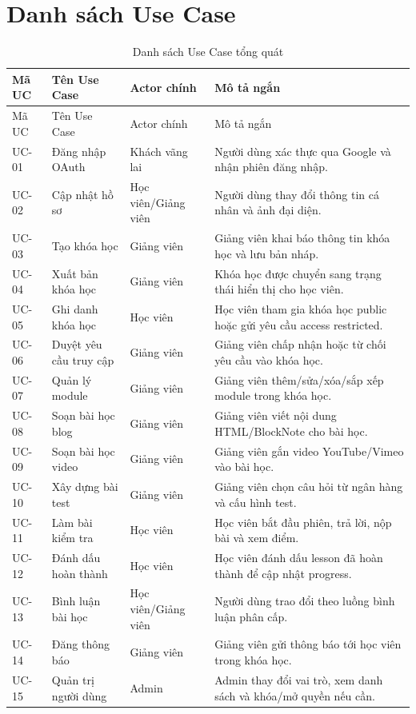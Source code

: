 \documentclass[12pt,a4paper]{report}
\begin{document}
\section{Danh sách Use Case}
\begin{longtable}{L{1.6cm} L{4.2cm} L{3cm} L{5.2cm}}
\caption{Danh sách Use Case tổng quát}\label{tab:usecases}\\
\toprule
Mã UC & Tên Use Case & Actor chính & Mô tả ngắn \\
\midrule
\endfirsthead
\toprule
Mã UC & Tên Use Case & Actor chính & Mô tả ngắn \\
\midrule
\endhead
UC-01 & Đăng nhập OAuth & Khách vãng lai & Người dùng xác thực qua Google và nhận phiên đăng nhập. \\
UC-02 & Cập nhật hồ sơ & Học viên/Giảng viên & Người dùng thay đổi thông tin cá nhân và ảnh đại diện. \\
UC-03 & Tạo khóa học & Giảng viên & Giảng viên khai báo thông tin khóa học và lưu bản nháp. \\
UC-04 & Xuất bản khóa học & Giảng viên & Khóa học được chuyển sang trạng thái hiển thị cho học viên. \\
UC-05 & Ghi danh khóa học & Học viên & Học viên tham gia khóa học public hoặc gửi yêu cầu access restricted. \\
UC-06 & Duyệt yêu cầu truy cập & Giảng viên & Giảng viên chấp nhận hoặc từ chối yêu cầu vào khóa học. \\
UC-07 & Quản lý module & Giảng viên & Giảng viên thêm/sửa/xóa/sắp xếp module trong khóa học. \\
UC-08 & Soạn bài học blog & Giảng viên & Giảng viên viết nội dung HTML/BlockNote cho bài học. \\
UC-09 & Soạn bài học video & Giảng viên & Giảng viên gắn video YouTube/Vimeo vào bài học. \\
UC-10 & Xây dựng bài test & Giảng viên & Giảng viên chọn câu hỏi từ ngân hàng và cấu hình test. \\
UC-11 & Làm bài kiểm tra & Học viên & Học viên bắt đầu phiên, trả lời, nộp bài và xem điểm. \\
UC-12 & Đánh dấu hoàn thành & Học viên & Học viên đánh dấu lesson đã hoàn thành để cập nhật progress. \\
UC-13 & Bình luận bài học & Học viên/Giảng viên & Người dùng trao đổi theo luồng bình luận phân cấp. \\
UC-14 & Đăng thông báo & Giảng viên & Giảng viên gửi thông báo tới học viên trong khóa học. \\
UC-15 & Quản trị người dùng & Admin & Admin thay đổi vai trò, xem danh sách và khóa/mở quyền nếu cần. \\
\bottomrule
\end{longtable}
\end{document}
